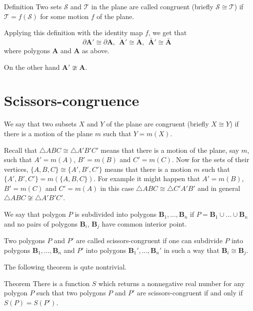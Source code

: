 {\begin{thm}{Definition}\label{def:cong-sets}
Two sets $\mathcal{S}$ and $\mathcal{T}$ in the plane  
are called congruent 
(briefly $\mathcal{S}\cong \mathcal{T}$)
if 
$\mathcal{T}=f(\mathcal{S})$ for some motion $f$ of the plane.
\end{thm}

Applying this definition with the identity map $f$,
we get that
\[\partial\bm{A}'\cong\partial\bm{A},\ \  
\mathring{\bm{A}}'\cong\mathring{\bm{A}},\ \ 
\bar{\bm{A}}'\cong\bar{\bm{A}}\]
where polygons $\bm{A}$ and $\bm{A}$ as above.

On the other hand $\bm{A}'\ncong\bm{A}$.















\section*{Scissors-congruence}

We say that two subsets $X$ and $Y$ 
of the plane are congruent (briefly $X\cong Y$)
if there is a motion of the plane $m$
such that $Y=m(X)$.

Recall that $\triangle ABC\cong\triangle A'B'C'$ means that there is a motion of the plane, say $m$, 
such that $A'=m(A)$, $B'=m(B)$ and $C'=m(C)$.
Now for the sets of their vertices,
$\{A,B,C\}\cong\{A',B',C'\}$ means that there is a motion $m$ such that $\{A',B',C'\}=m(\{A,B,C\})$.
For example it might happen that $A'=m(B)$, $B'=m(C)$ and $C'=m(A)$
in this case $\triangle ABC\cong\triangle C'A'B'$ and in general $\triangle ABC\not\cong\triangle A'B'C'$.

We say that polygon $P$ is subdivided into polygons $\bm{B}_1,\dots, \bm{B}_n$
if $P=\bm{B}_1\cup\dots\cup \bm{B}_n$ and no pairs of polygons $\bm{B}_i$, $\bm{B}_j$ have common interior point.

Two polygons $P$ and $P'$ are called scissors-congruent
if one can subdivide $P$ into polygons $\bm{B}_1,\dots, \bm{B}_n$
and $P'$ into polygons $\bm{B}_1',\dots, \bm{B}_n'$
in such a way that $\bm{B}_i\cong \bm{B}_j$.



The following theorem is qute nontrivial.

\begin{thm}{Theorem}
There is a function $S$ which returns a nonnegative real number for any polygon $P$ such that two polygons $P$ and $P'$ are scissors-congruent
if and only if $S(P)=S(P')$.
\end{thm}

}
